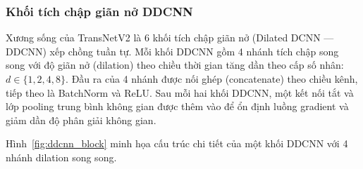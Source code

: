 \subsubsection{Khối tích chập giãn nở DDCNN}
\label{subsubsec:ddcnn}

Xương sống của TransNetV2 là 6 khối tích chập giãn nở (Dilated DCNN — DDCNN) xếp chồng tuần tự. Mỗi khối DDCNN gồm 4 nhánh tích chập song song với độ giãn nở (dilation) theo chiều thời gian tăng dần theo cấp số nhân: $d \in \{1, 2, 4, 8\}$. Đầu ra của 4 nhánh được nối ghép (concatenate) theo chiều kênh, tiếp theo là BatchNorm và ReLU. Sau mỗi hai khối DDCNN, một kết nối tắt và lớp pooling trung bình không gian được thêm vào để ổn định luồng gradient và giảm dần độ phân giải không gian.

Hình~\ref{fig:ddcnn_block} minh họa cấu trúc chi tiết của một khối DDCNN với 4 nhánh dilation song song.

